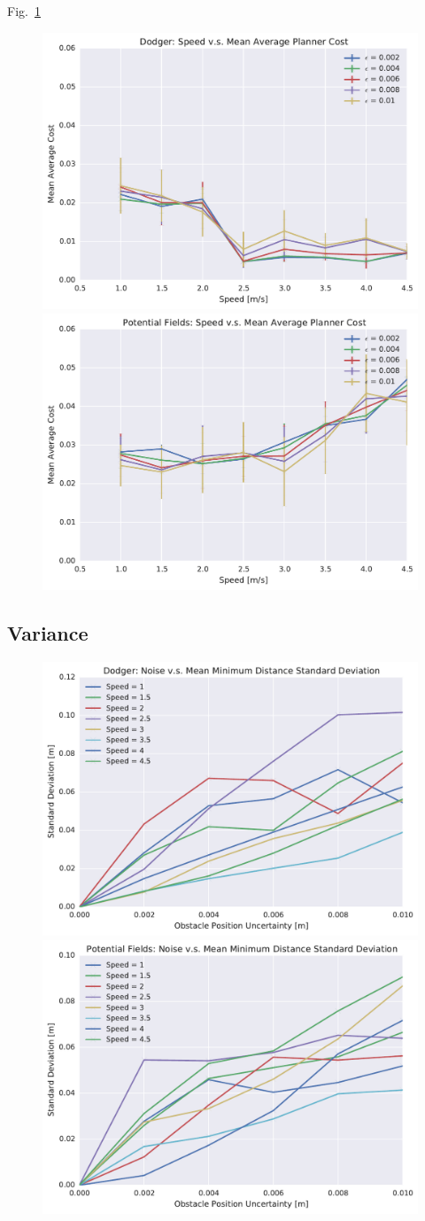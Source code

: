 Fig.~\ref{fig:plot_avg_cost}

\begin{figure}[h!]
    \centering
    \includegraphics[width=0.48\linewidth]{figs/planner_mean_avg_cost_0}
    \includegraphics[width=0.48\linewidth]{figs/pf_mean_avg_cost_0}
    \caption{}
    \label{fig:plot_avg_cost}
\end{figure}

\subsection{Variance}

\begin{figure}[h!]
    \centering
    \includegraphics[width=0.48\linewidth]{figs/planner_std_min_distance_0}
    \includegraphics[width=0.48\linewidth]{figs/pf_std_min_distance_0}
    \caption{}
    \label{fig:plot_std_min_distance}
\end{figure}

